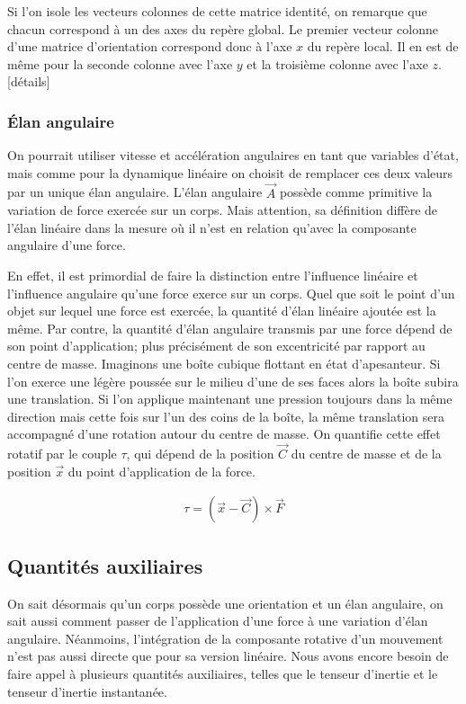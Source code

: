 Si l'on isole les vecteurs colonnes de cette matrice identité, on
remarque que chacun correspond à un des axes du repère global. Le
premier vecteur colonne d'une matrice d'orientation correspond donc à
l'axe $x$ du repère local. Il en est de même pour la seconde colonne
avec l'axe $y$ et la troisième colonne avec l'axe $z$. [détails]

\subsubsection{\'Elan angulaire}

On pourrait utiliser vitesse et accélération angulaires en tant que
variables d'état, mais comme pour la dynamique linéaire on choisit de
remplacer ces deux valeurs par un unique élan angulaire. L'élan
angulaire $\vec A$ possède comme primitive la variation de force
exercée sur un corps. Mais attention, sa définition diffère de l'élan
linéaire dans la mesure o\`u il n'est en relation qu'avec la
composante angulaire d'une force.

En effet, il est primordial de faire la distinction entre l'influence
linéaire et l'influence angulaire qu'une force exerce sur un
corps. Quel que soit le point d'un objet sur lequel une force est
exercée, la quantité d'élan linéaire ajoutée est la même. Par contre,
la quantité d'élan angulaire transmis par une force dépend de son
point d'application; plus précisément de son excentricité par rapport
au centre de masse. Imaginons une boîte cubique flottant en état
d'apesanteur. Si l'on exerce une légère poussée sur le milieu d'une de
ses faces alors la boîte subira une translation. Si l'on applique
maintenant une pression toujours dans la même direction mais cette
fois sur l'un des coins de la boîte, la même translation sera
accompagné d'une rotation autour du centre de masse. On quantifie
cette effet rotatif par le couple $\tau$, qui dépend de la position
$\vec C$ du centre de masse et de la position $\vec x$ du point
d'application de la force.

\begin{align*}
  \tau = (\vec{x} - \vec{C}) \times \vec{F}
\end{align*}

\subsection{Quantités auxiliaires}

On sait désormais qu'un corps possède une orientation et un élan
angulaire, on sait aussi comment passer de l'application d'une force à
une variation d'élan angulaire. Néanmoins, l'intégration de la
composante rotative d'un mouvement n'est pas aussi directe que pour sa
version linéaire. Nous avons encore besoin de faire appel à plusieurs
quantités auxiliaires, telles que le tenseur d'inertie et le tenseur
d'inertie instantanée.

